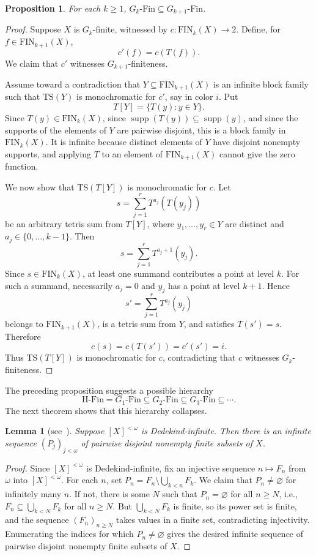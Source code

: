 \documentclass[10pt,a4paper]{amsart}
\newtheorem{proposition}[theorem]{Proposition}
\newtheorem{lemma}[theorem]{Lemma}
\theoremstyle{definition}
\DeclareMathOperator{\supp}{supp}
\newcommand{\Fin}{\mathrm{Fin}}
\newcommand{\HFin}{\mathrm{H\text{-}Fin}}
\newcommand{\FIN}{\mathrm{FIN}}
\newcommand{\TS}{\mathrm{TS}}
\begin{document}
\begin{proposition}\label{prop:gk-monotone}
For each \(k\geq 1\), \(G_k\text{-}\Fin\subseteq G_{k+1}\text{-}\Fin\).
\end{proposition}

\begin{proof}
Suppose \(X\) is \(G_k\)-finite, witnessed by \(c:\FIN_k(X)\to 2\).  Define, for \(f\in\FIN_{k+1}(X)\),
\[
    c'(f)=c(T(f)).
\]
We claim that \(c'\) witnesses \(G_{k+1}\)-finiteness.

Assume toward a contradiction that \(Y\subseteq\FIN_{k+1}(X)\) is an infinite block family such that \(\TS(Y)\) is monochromatic for \(c'\), say in color \(i\).  Put
\[
    T[Y]=\{T(y):y\in Y\}.
\]
Since \(T(y)\in\FIN_k(X)\), since \(\supp(T(y))\subseteq\supp(y)\), and since the supports of the elements of \(Y\) are pairwise disjoint, this is a block family in \(\FIN_k(X)\).  It is infinite because distinct elements of \(Y\) have disjoint nonempty supports, and applying \(T\) to an element of \(\FIN_{k+1}(X)\) cannot give the zero function.

We now show that \(\TS(T[Y])\) is monochromatic for \(c\).  Let
\[
    s=\sum_{j=1}^r T^{a_j}(T(y_j))
\]
be an arbitrary tetris sum from \(T[Y]\), where \(y_1,\dots,y_r\in Y\) are distinct and \(a_j\in\{0,\dots,k-1\}\).  Then
\[
    s=\sum_{j=1}^r T^{a_j+1}(y_j).
\]
Since \(s\in\FIN_k(X)\), at least one summand contributes a point at level \(k\).  For such a summand, necessarily \(a_j=0\) and \(y_j\) has a point at level \(k+1\).  Hence
\[
    s'=\sum_{j=1}^r T^{a_j}(y_j)
\]
belongs to \(\FIN_{k+1}(X)\), is a tetris sum from \(Y\), and satisfies \(T(s')=s\).  Therefore
\[
    c(s)=c(T(s'))=c'(s')=i.
\]
Thus \(\TS(T[Y])\) is monochromatic for \(c\), contradicting that \(c\) witnesses \(G_k\)-finiteness.
\end{proof}

The preceding proposition suggests a possible hierarchy
\[
    \HFin=G_1\text{-}\Fin\subseteq G_2\text{-}\Fin\subseteq G_3\text{-}\Fin\subseteq\cdots.
\]
The next theorem shows that this hierarchy collapses.

\begin{lemma}[{see\ \cite[Theorem~3.2]{BCF}}]\label{lem:disjoint-pieces}
Suppose \([X]^{<\omega}\) is Dedekind-infinite.  Then there is an infinite sequence \((P_j)_{j<\omega}\) of pairwise disjoint nonempty finite subsets of \(X\).
\end{lemma}

\begin{proof}
Since \([X]^{<\omega}\) is Dedekind-infinite, fix an injective sequence \(n\longmapsto F_n\) from \(\omega\) into \([X]^{<\omega}\).  For each \(n\), set \(P_n=F_n\setminus\bigcup_{k<n}F_k\).  We claim that \(P_n\neq\varnothing\) for infinitely many \(n\).  If not, there is some \(N\) such that \(P_n=\varnothing\) for all \(n\geq N\), i.e., \(F_n\subseteq\bigcup_{k<N}F_k\) for all \(n\geq N\).  But \(\bigcup_{k<N}F_k\) is finite, so its power set is finite, and the sequence \((F_n)_{n\geq N}\) takes values in a finite set, contradicting injectivity.  Enumerating the indices for which \(P_n\neq\varnothing\) gives the desired infinite sequence of pairwise disjoint nonempty finite subsets of \(X\).
\end{proof}
\end{document}
